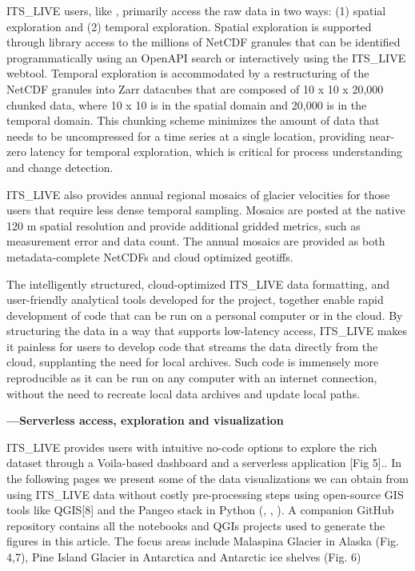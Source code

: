 \documentclass[
  super,
  preprint,
  3p,
  twocolumn]{elsarticle}
\begin{document}
ITS\_LIVE users, like \citep[most Earth
Scientists][]{Fouilloux2018-jw, Marshall2022-je, Lopez2021-el},
primarily access the raw data in two ways: (1) spatial exploration and
(2) temporal exploration. Spatial exploration is supported through
library access to the millions of NetCDF granules that can be identified
programmatically using an OpenAPI search or interactively using the
ITS\_LIVE webtool. Temporal exploration is accommodated by a
restructuring of the NetCDF granules into Zarr datacubes that are
composed of 10 x 10 x 20,000 chunked data, where 10 x 10 is in the
spatial domain and 20,000 is in the temporal domain. This chunking
scheme minimizes the amount of data that needs to be uncompressed for a
time series at a single location, providing near-zero latency for
temporal exploration, which is critical for process understanding and
change detection.

ITS\_LIVE also provides annual regional mosaics of glacier velocities
for those users that require less dense temporal sampling. Mosaics are
posted at the native 120 m spatial resolution and provide additional
gridded metrics, such as measurement error and data count. The annual
mosaics are provided as both metadata-complete NetCDFs and cloud
optimized geotiffs.

\newpage{}

The intelligently structured, cloud-optimized ITS\_LIVE data formatting,
and user-friendly analytical tools developed for the project, together
enable rapid development of code that can be run on a personal computer
or in the cloud. By structuring the data in a way that supports
low-latency access, ITS\_LIVE makes it painless for users to develop
code that streams the data directly from the cloud, supplanting the need
for local archives. Such code is immensely more reproducible as it can
be run on any computer with an internet connection, without the need to
recreate local data archives and update local paths.

\textbf{---Serverless access, exploration and visualization}

ITS\_LIVE provides users with intuitive no-code options to explore the
rich dataset through a Voila-based dashboard and a serverless
application {[}Fig 5{]}.. In the following pages we present some of the
data visualizations we can obtain from using ITS\_LIVE data without
costly pre-processing steps using open-source GIS tools like QGIS{[}8{]}
and the Pangeo stack in Python (\citep[Xarray][]{Hoyer2017-su},
\citep[Zarr][]{Miles2023-yj} , \citep[HoloViews][]{Rudiger2020-yr}). A
companion GitHub repository contains all the notebooks and QGIs projects
used to generate the figures in this article. The focus areas include
Malaspina Glacier in Alaska (Fig. 4,7), Pine Island Glacier in
Antarctica and Antarctic ice shelves (Fig. 6)
\end{document}
